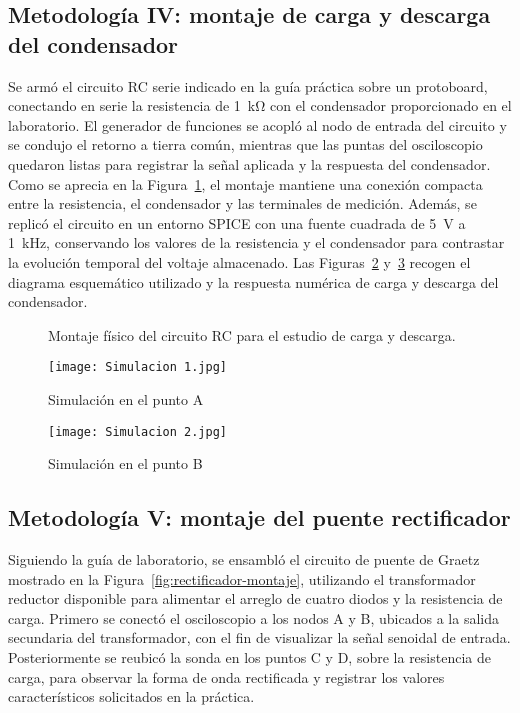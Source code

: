 \documentclass[conference]{IEEEtran} %
\begin{document}
\subsection{Metodología IV: montaje de carga y descarga del condensador}
Se armó el circuito RC serie indicado en la guía práctica sobre un protoboard, conectando en serie la resistencia de \SI{1}{\kilo\ohm} con el condensador proporcionado en el laboratorio. El generador de funciones se acopló al nodo de entrada del circuito y se condujo el retorno a tierra común, mientras que las puntas del osciloscopio quedaron listas para registrar la señal aplicada y la respuesta del condensador. Como se aprecia en la Figura~\ref{fig:montaje-rc}, el montaje mantiene una conexión compacta entre la resistencia, el condensador y las terminales de medición. Además, se replicó el circuito en un entorno SPICE con una fuente cuadrada de \SI{5}{\volt} a \SI{1}{\kilo\hertz}, conservando los valores de la resistencia y el condensador para contrastar la evolución temporal del voltaje almacenado. Las Figuras~\ref{fig:simulacion-rc-esquematico} y~\ref{fig:simulacion-rc-respuesta} recogen el diagrama esquemático utilizado y la respuesta numérica de carga y descarga del condensador.
\begin{figure}[htbp]
    \centering
    \framebox[0.75\linewidth]{\rule{0pt}{3.5cm}}
    \caption{Montaje físico del circuito RC para el estudio de carga y descarga.}
    \label{fig:montaje-rc}
\end{figure}
\begin{figure}[htbp]
    \centering
\texttt{[image: Simulacion 1.jpg]}
    \caption{Simulación en el punto A}
    \label{fig:simulacion-rc-esquematico}
\end{figure}
\begin{figure}[htbp]
    \centering
\texttt{[image: Simulacion 2.jpg]}
    \caption{Simulación en el punto B}
    \label{fig:simulacion-rc-respuesta}
\end{figure}

\subsection{Metodología V: montaje del puente rectificador}
Siguiendo la guía de laboratorio, se ensambló el circuito de puente de Graetz mostrado en la Figura~\ref{fig:rectificador-montaje}, utilizando el transformador reductor disponible para alimentar el arreglo de cuatro diodos y la resistencia de carga. Primero se conectó el osciloscopio a los nodos A y B, ubicados a la salida secundaria del transformador, con el fin de visualizar la señal senoidal de entrada. Posteriormente se reubicó la sonda en los puntos C y D, sobre la resistencia de carga, para observar la forma de onda rectificada y registrar los valores característicos solicitados en la práctica.
\end{document}
